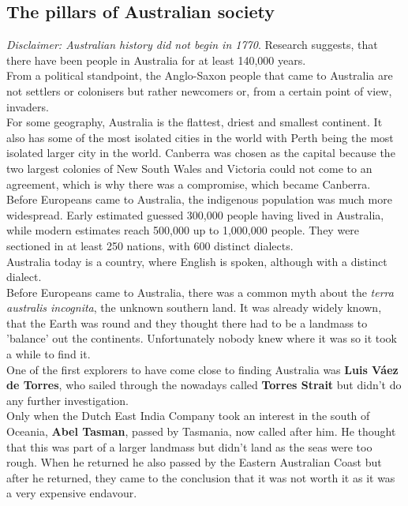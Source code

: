 \documentclass{article}
\begin{document}
	\subsection{The pillars of Australian society}
	\textit{Disclaimer: Australian history did not begin in 1770}. Research suggests, that there have been people in Australia for at least 140,000 years. \\
	From a political standpoint, the Anglo-Saxon people that came to Australia are not settlers or colonisers but rather newcomers or, from a certain point of view, invaders. \\
	For some geography, Australia is the flattest, driest and smallest continent. It also has some of the most isolated cities in the world with Perth being the most isolated larger city in the world. Canberra was chosen as the capital because the two largest colonies of New South Wales and Victoria could not come to an agreement, which is why there was a compromise, which became Canberra. \\
	Before Europeans came to Australia, the indigenous population was much more widespread. Early estimated guessed 300,000 people having lived in Australia, while modern estimates reach 500,000 up to 1,000,000 people. They were sectioned in at least 250 nations, with 600 distinct dialects. \\
	Australia today is a country, where English is spoken, although with a distinct dialect. \\
	Before Europeans came to Australia, there was a common myth about the \textit{terra australis incognita}, the unknown southern land. It was already widely known, that the Earth was round and they thought there had to be a landmass to 'balance' out the continents. Unfortunately nobody knew where it was so it took a while to find it. \\
	One of the first explorers to have come close to finding Australia was \textbf{Luis Váez de Torres}, who sailed through the nowadays called \textbf{Torres Strait} but didn't do any further investigation. \\
	Only when the Dutch East India Company took an interest in the south of Oceania, \textbf{Abel Tasman}, passed by Tasmania, now called after him. He thought that this was part of a larger landmass but didn't land as the seas were too rough. When he returned he also passed by the Eastern Australian Coast but after he returned, they came to the conclusion that it was not worth it as it was a very expensive endavour. \\
\end{document}
